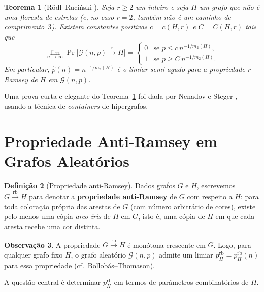 \documentclass[reqno, 12pt]{amsart}
\numberwithin{equation}{section}
\theoremstyle{plain}
\newtheorem{theorem}{Teorema}[section]
\theoremstyle{definition}
\newtheorem{definition}[theorem]{Definição}
\newtheorem{remark}[theorem]{Observação}
\newcommand{\Gnp}{\mathcal{G}(n,p)}
\newcommand{\rb}{\xrightarrow{\,\mathrm{rb}\,}}
\newcommand{\ramsey}[1]{\xrightarrow{\,#1\,}}
\newcommand{\mdens}{m_2}
\begin{document}
\begin{theorem}[Rödl--Ruciński \cite{rodl1993lower, rodl1994random, rodl1995threshold}]
    \label{thm:rodl-rucinski}
    Seja $r \ge 2$ um inteiro e seja $H$ um grafo que não é uma floresta de estrelas
    (e, no caso $r = 2$, também não é um caminho de comprimento~$3$).
    Existem constantes positivas $c = c(H,r)$ e $C = C(H,r)$ tais que
    \[
        \lim_{n\to\infty} \Pr\!\bigl[\Gnp \ramsey{r} H\bigr] =
        \begin{cases}
            0 & \text{se } p \le c\, n^{-1/\mdens(H)}, \\
            1 & \text{se } p \ge C\, n^{-1/\mdens(H)}.
        \end{cases}
    \]
    Em particular, $\hat{p}(n) = n^{-1/\mdens(H)}$ é o limiar semi-agudo para
    a propriedade $r$-Ramsey de $H$ em $\Gnp$.
\end{theorem}

Uma prova curta e elegante do Teorema~\ref{thm:rodl-rucinski} foi dada por
Nenadov e Steger \cite{nenadov2016short}, usando a técnica de
\emph{containers} de hipergrafos.

\section{Propriedade Anti-Ramsey em Grafos Aleatórios} \label{sec:antiramsey}

\begin{definition}[Propriedade anti-Ramsey]
    \label{def:antiramsey}
    Dados grafos $G$ e $H$, escrevemos $G \rb H$ para denotar a
    \textbf{propriedade anti-Ramsey} de $G$ com respeito a $H$:
    para toda coloração própria das arestas de $G$
    (com número arbitrário de cores),
    existe pelo menos uma cópia \emph{arco-íris} de $H$ em $G$,
    isto é, uma cópia de $H$ em que cada aresta recebe uma cor distinta.
\end{definition}

\begin{remark}
    A propriedade $G \rb H$ é monótona crescente em $G$.
    Logo, para qualquer grafo fixo $H$, o grafo aleatório $\Gnp$ admite
    um limiar $p_H^{\mathrm{rb}} = p_H^{\mathrm{rb}}(n)$ para essa propriedade
    (cf.~Bollobás--Thomason).
\end{remark}

A questão central é determinar $p_H^{\mathrm{rb}}$ em termos de parâmetros
combinatórios de $H$.
\end{document}
